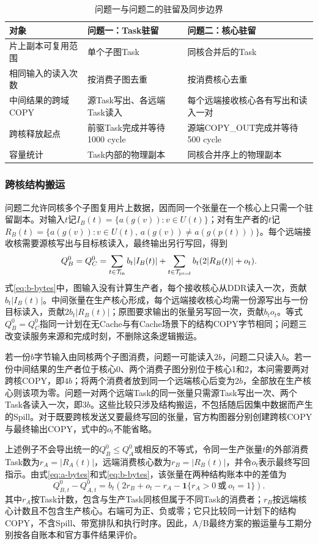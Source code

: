 \begin{table}[H]\centering\caption{问题一与问题二的驻留及同步边界}\label{tab:b-rule-contrast}
\begin{tabularx}{\linewidth}{lYY}\toprule
对象 & 问题一：Task驻留 & 问题二：核心驻留\\\midrule
片上副本可复用范围 & 单个子图Task & 同核合并后的Task\\
相同输入的读入次数 & 按消费子图去重 & 按消费核心去重\\
中间结果的跨域COPY & 源Task写出、各远端Task读入 & 每个远端接收核心各有写出和读入一对\\
跨核释放起点 & 前驱Task完成并等待1000 cycle & 源端COPY\_OUT完成并等待500 cycle\\
容量统计 & Task内部的物理副本 & 同核合并序上的物理副本\\\bottomrule
\end{tabularx}\end{table}

\subsubsection{跨核结构搬运}
问题二允许同核多个子图复用片上数据，因而同一个张量在一个核心上只需一个驻留副本。对输入$t$记$I_B(t)=\{a(g(v)):v\in U(t)\}$；对有生产者的$t$记$R_B(t)=\{a(g(v)):v\in U(t),\,a(g(v))\ne a(g(p(t)))\}$。每个远端接收核需要源核写出与目标核读入，最终输出另行写回，得到
\begin{equation}
Q_B^0=Q_C^0=
\sum_{t\in\mathcal T_{\rm in}}b_t|I_B(t)|
+\sum_{t\in\mathcal T_{\rm prod}}b_t(2|R_B(t)|+o_t).
\label{eq:b-bytes}
\end{equation}
式\eqref{eq:b-bytes}中，图输入没有计算生产者，每个接收核心从DDR读入一次，贡献$b_t|I_B(t)|$。中间张量在生产核心形成，每个远端接收核心均需一份源写出与一份目标读入，贡献$2b_t|R_B(t)|$；原图要求输出的张量另写回一次，贡献$b_t o_t$。等式$Q_B^0=Q_C^0$指同一计划在无Cache与有Cache场景下的结构COPY字节相同；问题三改变读服务来源和完成时刻，不删除这条逻辑搬运。

若一份$b$字节输入由同核两个子图消费，问题一可能读入$2b$，问题二只读入$b$。若一份中间结果的生产者位于核心0、两个消费子图分别位于核心1和2，本问需要两对跨核COPY，即$4b$；将两个消费者放到同一个远端核心后变为$2b$，全部放在生产核心则该项为零。问题一对两个远端Task的同一张量只需源Task写出一次、两个Task各读入一次，即$3b$。这些比较只涉及结构搬运，不包括随后因集中数据而产生的Spill。对于既要跨核发送又要最终写回的张量，官方构图器分别创建跨核COPY与最终输出COPY，式中的$o_t$不能省略。

上述例子不会导出统一的$Q_B^0\le Q_A^0$或相反的不等式，令同一生产张量$t$的外部消费Task数为$r_A=|R_A(t)|$，远端消费核心数为$r_B=|R_B(t)|$，并令$o_t$表示最终写回指示。由式\eqref{eq:a-bytes}和式\eqref{eq:b-bytes}，该张量在两种结构账本中的差值为
\begin{equation}
Q_{B,t}^0-Q_{A,t}^0
=b_t\left(2r_B+o_t-r_A-\mathbf 1\{r_A>0\ \text{或}\ o_t=1\}\right).
\label{eq:ab-structure-difference}
\end{equation}
其中$r_A$按Task计数，包含与生产Task同核但属于不同Task的消费者；$r_B$按远端核心计数且不包含生产核心。右端可为正、负或零；它只比较同一计划下的结构COPY，不含Spill、带宽排队和执行时序。因此，A/B最终方案的搬运量与工期分别按各自账本和官方事件结果评价。

